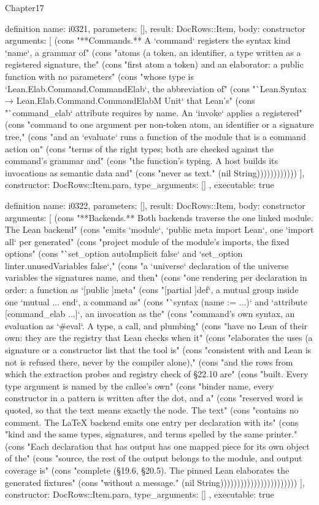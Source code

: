 \begin{lexlean}{Chapter17}
\begin{semanticmodule}
definition{
  name: i0321,
  parameters: [],
  result: DocRows::Item,
  body: constructor{
    arguments: [
      (cons "**Commands.** A `command` registers the syntax kind `name`, a grammar of" (cons "atoms (a token, an identifier, a type written as a registered signature, the" (cons "first atom a token) and an elaborator: a public function with no parameters" (cons "whose type is `Lean.Elab.Command.CommandElab`, the abbreviation of" (cons "`Lean.Syntax → Lean.Elab.Command.CommandElabM Unit` that Lean's" (cons "`command_elab` attribute requires by name. An `invoke` applies a registered" (cons "command to one argument per non-token atom, an identifier or a signature tree," (cons "and an `evaluate` runs a function of the module that is a command action on" (cons "terms of the right types; both are checked against the command's grammar and" (cons "the function's typing. A host builds its invocations as semantic data and" (cons "never as text." (nil String))))))))))))
    ],
    constructor: DocRows::Item.para,
    type_arguments: []
  },
  executable: true
}

definition{
  name: i0322,
  parameters: [],
  result: DocRows::Item,
  body: constructor{
    arguments: [
      (cons "**Backends.** Both backends traverse the one linked module. The Lean backend" (cons "emits `module`, `public meta import Lean`, one `import all` per generated" (cons "project module of the module's imports, the fixed options" (cons "`set_option autoImplicit false` and `set_option linter.unusedVariables false`," (cons "a `universe` declaration of the universe variables the signatures name, and then" (cons "one rendering per declaration in order: a function as `[public ]meta" (cons "[partial ]def`, a mutual group inside one `mutual ... end`, a command as" (cons "`syntax (name := ...)` and `attribute [command_elab ...]`, an invocation as the" (cons "command's own syntax, an evaluation as `#eval`. A type, a call, and plumbing" (cons "have no Lean of their own: they are the registry that Lean checks when it" (cons "elaborates the uses (a signature or a constructor list that the tool is" (cons "consistent with and Lean is not is refused there, never by the compiler alone)," (cons "and the rows from which the extraction probes and registry check of §22.10 are" (cons "built. Every type argument is named by the callee's own" (cons "binder name, every constructor in a pattern is written after the dot, and a" (cons "reserved word is quoted, so that the text means exactly the node. The text" (cons "contains no comment. The LaTeX backend emits one entry per declaration with its" (cons "kind and the same types, signatures, and terms spelled by the same printer." (cons "Each declaration that has output has one mapped piece for its own object of the" (cons "source, the rest of the output belongs to the module, and output coverage is" (cons "complete (§19.6, §20.5). The pinned Lean elaborates the generated fixtures" (cons "without a message." (nil String)))))))))))))))))))))))
    ],
    constructor: DocRows::Item.para,
    type_arguments: []
  },
  executable: true
}


\end{semanticmodule}
\end{lexlean}
